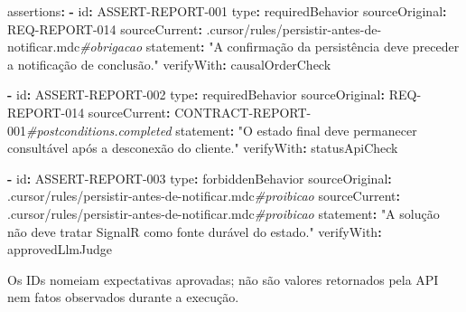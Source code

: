 \documentclass[
  10pt,
  a4paper,
  oneside]{book}
\newenvironment{Shaded}{}{}
\newcommand{\AttributeTok}[1]{\textcolor[rgb]{0.49,0.56,0.16}{#1}}
\newcommand{\CommentTok}[1]{\textcolor[rgb]{0.38,0.63,0.69}{\textit{#1}}}
\newcommand{\FunctionTok}[1]{\textcolor[rgb]{0.02,0.16,0.49}{#1}}
\newcommand{\KeywordTok}[1]{\textcolor[rgb]{0.00,0.44,0.13}{\textbf{#1}}}
\newcommand{\StringTok}[1]{\textcolor[rgb]{0.25,0.44,0.63}{#1}}
\renewenvironment{Shaded}{\begin{snugshade}}{\end{snugshade}}%
\begin{document}
\begin{Shaded}
\begin{Highlighting}[]
\FunctionTok{assertions}\KeywordTok{:}
\AttributeTok{  }\KeywordTok{{-}}\AttributeTok{ }\FunctionTok{id}\KeywordTok{:}\AttributeTok{ ASSERT{-}REPORT{-}001}
\AttributeTok{    }\FunctionTok{type}\KeywordTok{:}\AttributeTok{ requiredBehavior}
\AttributeTok{    }\FunctionTok{sourceOriginal}\KeywordTok{:}\AttributeTok{ REQ{-}REPORT{-}014}
\AttributeTok{    }\FunctionTok{sourceCurrent}\KeywordTok{:}\AttributeTok{ .cursor/rules/persistir{-}antes{-}de{-}notificar.mdc}\CommentTok{\#obrigacao}
\AttributeTok{    }\FunctionTok{statement}\KeywordTok{:}\AttributeTok{ }\StringTok{"A confirmação da persistência deve preceder a notificação de conclusão."}
\AttributeTok{    }\FunctionTok{verifyWith}\KeywordTok{:}\AttributeTok{ causalOrderCheck}

\AttributeTok{  }\KeywordTok{{-}}\AttributeTok{ }\FunctionTok{id}\KeywordTok{:}\AttributeTok{ ASSERT{-}REPORT{-}002}
\AttributeTok{    }\FunctionTok{type}\KeywordTok{:}\AttributeTok{ requiredBehavior}
\AttributeTok{    }\FunctionTok{sourceOriginal}\KeywordTok{:}\AttributeTok{ REQ{-}REPORT{-}014}
\AttributeTok{    }\FunctionTok{sourceCurrent}\KeywordTok{:}\AttributeTok{ CONTRACT{-}REPORT{-}001}\CommentTok{\#postconditions.completed}
\AttributeTok{    }\FunctionTok{statement}\KeywordTok{:}\AttributeTok{ }\StringTok{"O estado final deve permanecer consultável após a desconexão do cliente."}
\AttributeTok{    }\FunctionTok{verifyWith}\KeywordTok{:}\AttributeTok{ statusApiCheck}

\AttributeTok{  }\KeywordTok{{-}}\AttributeTok{ }\FunctionTok{id}\KeywordTok{:}\AttributeTok{ ASSERT{-}REPORT{-}003}
\AttributeTok{    }\FunctionTok{type}\KeywordTok{:}\AttributeTok{ forbiddenBehavior}
\AttributeTok{    }\FunctionTok{sourceOriginal}\KeywordTok{:}\AttributeTok{ .cursor/rules/persistir{-}antes{-}de{-}notificar.mdc}\CommentTok{\#proibicao}
\AttributeTok{    }\FunctionTok{sourceCurrent}\KeywordTok{:}\AttributeTok{ .cursor/rules/persistir{-}antes{-}de{-}notificar.mdc}\CommentTok{\#proibicao}
\AttributeTok{    }\FunctionTok{statement}\KeywordTok{:}\AttributeTok{ }\StringTok{"A solução não deve tratar SignalR como fonte durável do estado."}
\AttributeTok{    }\FunctionTok{verifyWith}\KeywordTok{:}\AttributeTok{ approvedLlmJudge}
\end{Highlighting}
\end{Shaded}

Os IDs nomeiam expectativas aprovadas; não são valores retornados pela
API nem fatos observados durante a execução.
\end{document}
